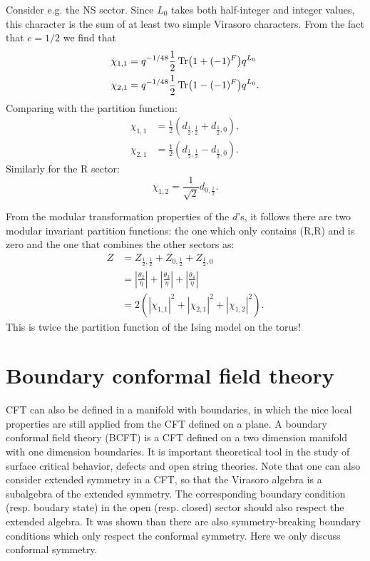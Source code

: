 \documentclass[submission, PhysLectNotes]{SciPost}
\begin{document}
Consider e.g. the NS sector. Since $L_0$ takes both half-integer and integer values, this character is the sum of at least two simple Virasoro characters. From the fact that $c=1/2$ we find that
\begin{align}
	\chi_{1,1} &= q^{-1/48}\frac{1}{2}\Tr(1+(-1)^F)q^{L_0}\\
	\chi_{2,1} &= q^{-1/48}\frac{1}{2}\Tr(1-(-1)^F)q^{L_0}.
\end{align}
Comparing with the partition function:
\begin{align}
	\chi_{1,1} &= \frac{1}{2}\left(d_{\frac{1}{2},\frac{1}{2}} + d_{\frac{1}{2},0}\right),\\
	\chi_{2,1} &= \frac{1}{2}\left(d_{\frac{1}{2},\frac{1}{2}} - d_{\frac{1}{2},0}\right).
\end{align}
Similarly for the R sector:
\begin{equation}
	\chi_{1,2} = \frac{1}{\sqrt{2}}d_{0,\frac{1}{2}}.
\end{equation}

From the modular transformation properties of the $d$'s, it follows there are two modular invariant partition functions: the one which only contains (R,R) and is zero and the one that combines the other sectors as:
\begin{align}
	Z &= Z_{\frac{1}{2},\frac{1}{2}} + Z_{0,\frac{1}{2}} + Z_{\frac{1}{2},0}\\
	&= \left|\frac{\theta_2}{\eta}\right| + \left|\frac{\theta_3}{\eta}\right| + \left|\frac{\theta_4}{\eta}\right|\\
	&= 2\left(|\chi_{1,1}|^2 + |\chi_{2,1}|^2 + |\chi_{1,2}|^2\right).
\end{align}
This is twice the partition function of the Ising model on the torus!


\section{Boundary conformal field theory}
CFT can also be defined in a manifold with boundaries, in which the nice local properties are still applied from the CFT defined on a plane. A boundary conformal field theory (BCFT) is a CFT defined on a two dimension manifold with one dimension boundaries. It is important theoretical tool in the study of surface critical behavior, defects and open string theories. Note that one can also consider extended symmetry in a CFT, so that the Virasoro algebra is a subalgebra of the extended symmetry. The corresponding boundary condition (resp. boudary state) in the open (resp. closed) sector should also respect the extended algebra. It was shown than there are also symmetry-breaking boundary conditions which only respect the conformal symmetry. Here we only discuss conformal symmetry. 
\end{document}
